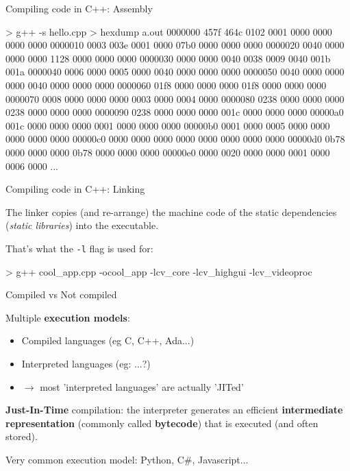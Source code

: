 \documentclass[compress]{beamer}
\begin{document}
\begin{frame}[fragile]{Compiling code in C++: Assembly}

\begin{shcode}
> g++ -s hello.cpp
> hexdump a.out
0000000 457f 464c 0102 0001 0000 0000 0000 0000
0000010 0003 003e 0001 0000 07b0 0000 0000 0000
0000020 0040 0000 0000 0000 1128 0000 0000 0000
0000030 0000 0000 0040 0038 0009 0040 001b 001a
0000040 0006 0000 0005 0000 0040 0000 0000 0000
0000050 0040 0000 0000 0000 0040 0000 0000 0000
0000060 01f8 0000 0000 0000 01f8 0000 0000 0000
0000070 0008 0000 0000 0000 0003 0000 0004 0000
0000080 0238 0000 0000 0000 0238 0000 0000 0000
0000090 0238 0000 0000 0000 001c 0000 0000 0000
00000a0 001c 0000 0000 0000 0001 0000 0000 0000
00000b0 0001 0000 0005 0000 0000 0000 0000 0000
00000c0 0000 0000 0000 0000 0000 0000 0000 0000
00000d0 0b78 0000 0000 0000 0b78 0000 0000 0000
00000e0 0000 0020 0000 0000 0001 0000 0006 0000
...
\end{shcode}
\end{frame}

\begin{frame}[fragile]{Compiling code in C++: Linking}

The linker copies (and re-arrange) the machine code of the static dependencies
(\emph{static libraries}) into the executable.

That's what the \texttt{-l} flag is used for:

\begin{shcode}
> g++ cool_app.cpp -ocool_app -lcv_core -lcv_highgui -lcv_videoproc
\end{shcode}

\end{frame}

\begin{frame}{Compiled vs Not compiled}

    Multiple \textbf{execution models}:

    \begin{itemize}
        \item<1-> Compiled languages (eg C, C++, Ada...)
        \item<2-> Interpreted languages (eg: ...?)
        \item<3-> $\rightarrow$ most 'interpreted languages' are actually 'JITed'
    \end{itemize}

     {

    \textbf{Just-In-Time} compilation: the interpreter generates an efficient
    \textbf{intermediate representation} (commonly called \textbf{bytecode})
    that is executed (and often stored).

    Very common execution model: Python, C\#, Javascript...

    }
\end{frame}
\end{document}
